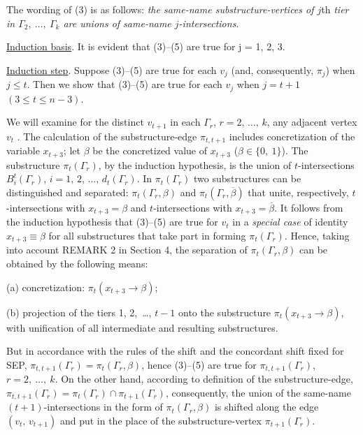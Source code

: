 \documentclass[12pt, a4paper]{article}
\begin{document}
\smallskip
The wording of (3) is as follows: {\it the same-name substructure-vertices of $j$}th {\it tier in $\Gamma_2, \ \dots,\ \Gamma_k$   are unions of same-name $j$-intersections}.

\smallskip
\underline{Induction basis}. It is evident that (3)--(5) are true for  j = 1, 2, 3.

\smallskip
\underline{Induction step}. Suppose (3)--(5) are true for each $v_j$
(and, consequently, $\pi_j$) when $j\le t$. Then we show that (3)--(5) are true for each $v_j$ when $j=t+1$ $(3\le t \le n-3)$.

We will examine for the distinct $v_{t+1}$ in each $\Gamma_r$, $r=2, \,\ldots,\, k$, any adjacent vertex $v_t$ . The calculation of the substructure-edge $\pi_{t,t+1}$ includes concretization of the variable $x_{t+3}$; let $\beta$  be the concretized value of $x_{t+3}$  ($\beta \in \{0,\ 1\}$). The substructure $\pi_t(\Gamma_r)$, by the induction hypothesis, is the union of $t$-intersections $B_i^t(\Gamma_r)$, $i=1,\,2, \,\ldots,\, d_t(\Gamma_r)$. In $\pi_t(\Gamma_r)$ two substructures can be distinguished and separated:  $\pi_t(\Gamma_r, \beta)$ and $\pi_t(\Gamma_r, \overline{\beta})$ that unite, respectively, $t$-intersections with  $x_{t+3}=\beta$ and  $t$-intersections with $x_{t+3}=\overline{\beta}$. It follows from the induction hypothesis that (3)--(5) are true for  $v_t$  in a {\it special case} of identity   $x_{t+3}\equiv \beta$  for all substructures that take part in forming   $\pi_t(\Gamma_r)$. Hence, taking into account REMARK 2 in Section 4, the separation of  $\pi_t(\Gamma_r, \beta)$  can be obtained by the following means:

\hangindent=1.3cm
(a) concretization: $\pi_t(x_{t+3}\to \beta)$;

\hangindent=1.3cm
(b) projection of the tiers 1, 2,\, \ldots, $t-1$ onto the substructure  $\pi_t(x_{t+3}\to \beta)$, with unification of all intermediate and resulting substructures.

But in accordance with the rules of the shift and the concordant shift
fixed for SEP, $\pi_{t,t+1}(\Gamma_r)= \pi_t(\Gamma_r, \beta)$, hence (3)--(5) are true for $\pi_{t,t+1}(\Gamma_r)$, $r=2, \ \dots,\ k$. On the other hand, according to definition of the substructure-edge, $\pi_{t,t+1}(\Gamma_r)=\pi_t(\Gamma_r)\cap \pi_{t+1}(\Gamma_r)$, consequently, the union of the same-name $(t+1)$-intersections in the form of $\pi_t(\Gamma_r, \beta)$ is shifted along the edge $(v_t,\,v_{t+1})$ and put in the place of the substructure-vertex  $\pi_{t+1}(\Gamma_r)$.
\end{document}
